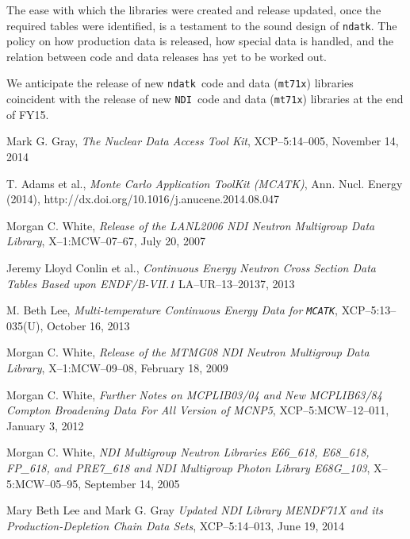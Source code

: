 \documentclass[12pt]{lamemo}
\newcommand{\ndatk}{\texttt{ndatk}}
\newcommand{\NDI}{\texttt{NDI}}
\begin{document}
The ease with which the libraries were created and release updated,
once the required tables were identified, is a testament to the sound
design of \ndatk.  The policy on how production data is released, how
special data is handled, and the relation between code and data
releases has yet to be worked out.

We anticipate the release of new \ndatk\ code and data
(\texttt{mt71x}) libraries coincident with the release of new
\NDI\ code and data (\texttt{mt71x}) libraries at the end of FY15.


\newpage
\begin{thebibliography}{99}

 Mark G. Gray, \emph{The Nuclear Data Access Tool
  Kit}, XCP--5:14--005, November 14, 2014

 T. Adams et al., \emph{Monte Carlo Application
  ToolKit (MCATK)}, Ann. Nucl. Energy (2014),
  http://dx.doi.org/10.1016/j.anucene.2014.08.047

 Morgan C. White, \emph{Release of the LANL2006 NDI
  Neutron Multigroup Data Library}, X--1:MCW--07--67, July 20, 2007

 Jeremy Lloyd Conlin et al., \emph{Continuous Energy
  Neutron Cross Section Data Tables Based upon ENDF/B-VII.1}
  LA--UR--13--20137, 2013

 M. Beth Lee, \emph{Multi-temperature Continuous Energy
  Data for \texttt{MCATK}}, XCP--5:13--035(U), October 16, 2013

 Morgan C. White, \emph{Release of the MTMG08 NDI
  Neutron Multigroup Data Library}, X--1:MCW--09--08, February 18,
  2009

 Morgan C. White, \emph{Further Notes on MCPLIB03/04
  and New MCPLIB63/84 Compton Broadening Data For All Version of MCNP5},
  XCP--5:MCW--12--011, January 3, 2012

 Morgan C. White, \emph{NDI Multigroup Neutron
  Libraries E66\_618, E68\_618, FP\_618, and PRE7\_618 and NDI
  Multigroup Photon Library E68G\_103}, X--5:MCW--05--95, September
  14, 2005

 Mary Beth Lee and Mark G. Gray \emph{Updated NDI
  Library MENDF71X and its Production-Depletion Chain Data Sets},
  XCP--5:14--013, June 19, 2014
\end{thebibliography}
\end{document}
